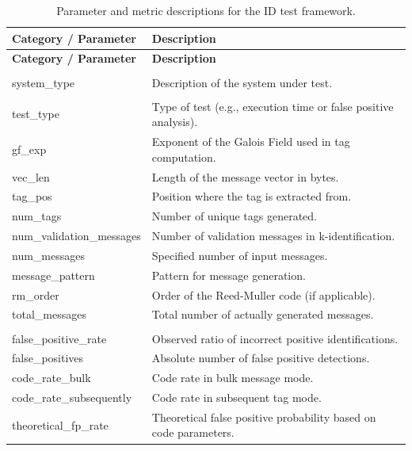 \documentclass[english,BCOR=4mm,cdfont=false]{tudscrreprt} %
\begin{document}
\begin{longtable}{@{} p{} p{} @{}}
\caption{Parameter and metric descriptions for the ID test framework.}
\label{tab:paramDescrip} \\
\toprule
\textbf{Category / Parameter} & \textbf{Description} \\
\midrule
\endfirsthead
\toprule
\textbf{Category / Parameter} & \textbf{Description} \\
\midrule
\endhead
\bottomrule
\endfoot
\bottomrule
\endlastfoot

\multicolumn{2}{@{}l}{\textbf{SUT Description}} \\
\quad system\_type & Description of the system under test. \\
\addlinespace
\multicolumn{2}{@{}l}{\textbf{Test Parameters}} \\
\quad test\_type & Type of test (e.g., execution time or false positive analysis). \\
\quad gf\_exp & Exponent of the Galois Field used in tag computation. \\
\quad vec\_len & Length of the message vector in bytes. \\
\quad tag\_pos & Position where the tag is extracted from. \\
\quad num\_tags & Number of unique tags generated. \\
\quad num\_validation\_messages & Number of validation messages in k-identification. \\
\quad num\_messages & Specified number of input messages. \\
\quad message\_pattern & Pattern for message generation. \\
\quad rm\_order & Order of the Reed-Muller code (if applicable). \\
\quad total\_messages & Total number of actually generated messages. \\
\addlinespace
\multicolumn{2}{@{}l}{\textbf{Collected Metrics}} \\
\quad false\_positive\_rate & Observed ratio of incorrect positive identifications. \\
\quad false\_positives & Absolute number of false positive detections. \\
\quad code\_rate\_bulk & Code rate in bulk message mode. \\
\quad code\_rate\_subsequently & Code rate in subsequent tag mode. \\
\quad theoretical\_fp\_rate & Theoretical false positive probability based on code parameters. \\

\end{longtable}
\end{document}
